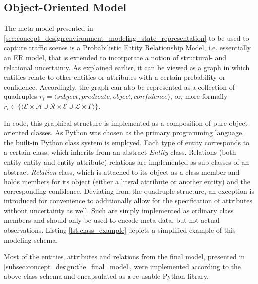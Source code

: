 \subsection{Object-Oriented Model}
\label{subsec:implementation:object_oriented_model}
The meta model presented in \cref{sec:concept_design:environment_modeling_state_representation} to be used to capture traffic scenes is a Probabilistic Entity Relationship Model, i.e. essentially an ER model, that is extended to incorporate a notion of structural- and relational uncertainty. As explained earlier, it can be viewed as a graph in which entities relate to other entities or attributes with a certain probability or confidence. Accordingly, the graph can also be represented as a collection of quadruples $r_i = \langle \textit{subject}, \textit{predicate}, \textit{object}, \textit{confidence} \rangle$, or, more formally $r_i \in \{ \langle \mathcal{E} \times \mathcal{A} \cup \mathcal{R} \times \mathcal{E} \cup \mathcal{L} \times \Gamma \rangle \}$. 

In code, this graphical structure is implemented as a composition of pure object-oriented classes. As Python was chosen as the primary programming language, the built-in Python class system is employed. Each type of entity corresponds to a certain class, which inherits from an abstract \textit{Entity} class. Relations (both entity-entity and entity-attribute) relations are implemented as sub-classes of an abstract \textit{Relation} class, which is attached to its object as a class member and holds members for its object (either a literal attribute or another entity) and the corresponding confidence. Deviating from the quadruple structure, an exception is introduced for convenience to additionally allow for the specification of attributes without uncertainty as well. Such are simply implemented as ordinary class members and should only be used to encode meta data, but not actual observations. Listing \ref{lst:class_example} depicts a simplified example of this modeling schema.

Most of the entities, attributes and relations from the final model, presented in \cref{subsec:concept_design:the_final_model}, were implemented according to the above class schema and encapsulated as a re-usable Python library.

\inputminted[fontsize=\footnotesize]{python}{97_listings/class_example.py}
\label{lst:class_example}

